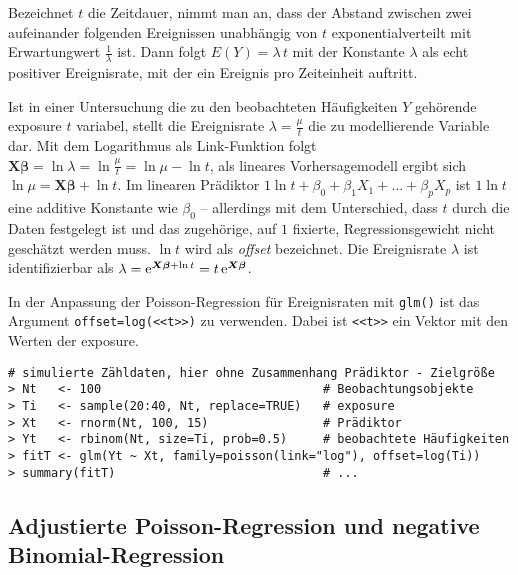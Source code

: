 Bezeichnet $t$ die Zeitdauer, nimmt man an, dass der Abstand zwischen zwei aufeinander folgenden Ereignissen unabhängig von $t$ exponentialverteilt mit Erwartungwert $\frac{1}{\lambda}$ ist. Dann folgt $E(Y) = \lambda \, t$ mit der Konstante $\lambda$ als echt positiver Ereignisrate, mit der ein Ereignis pro Zeiteinheit auftritt.

Ist in einer Untersuchung die zu den beobachteten Häufigkeiten $Y$ gehörende exposure $t$ variabel, stellt die Ereignisrate $\lambda = \frac{\mu}{t}$ die zu modellierende Variable dar. Mit dem Logarithmus als Link-Funktion folgt $\bm{X} \bm{\beta} = \ln \lambda = \ln \frac{\mu}{t} = \ln \mu - \ln t$, als lineares Vorhersagemodell ergibt sich $\ln \mu = \bm{X} \bm{\beta} + \ln t$. Im linearen Prädiktor $1 \ln t + \beta_{0} + \beta_{1} X_{1} + \dots + \beta_{p} X_{p}$ ist $1 \ln t$ eine additive Konstante wie $\beta_{0}$ -- allerdings mit dem Unterschied, dass $t$ durch die Daten festgelegt ist und das zugehörige, auf $1$ fixierte, Regressionsgewicht nicht geschätzt werden muss. $\ln t$ wird als \emph{offset} bezeichnet. Die Ereignisrate $\lambda$ ist identifizierbar als $\lambda = {\mathrm{e}}^{\bm{X} \bm{\beta} + \ln t} = t \, {\mathrm{e}}^{\bm{X} \bm{\beta}}$.

In der Anpassung der Poisson-Regression für Ereignisraten mit \lstinline!glm()! ist das Argument \lstinline!offset=log(<<t>>)! zu verwenden. Dabei ist \lstinline!<<t>>! ein Vektor mit den Werten der exposure.
\begin{lstlisting}
# simulierte Zähldaten, hier ohne Zusammenhang Prädiktor - Zielgröße
> Nt   <- 100                               # Beobachtungsobjekte
> Ti   <- sample(20:40, Nt, replace=TRUE)   # exposure
> Xt   <- rnorm(Nt, 100, 15)                # Prädiktor
> Yt   <- rbinom(Nt, size=Ti, prob=0.5)     # beobachtete Häufigkeiten
> fitT <- glm(Yt ~ Xt, family=poisson(link="log"), offset=log(Ti))
> summary(fitT)                             # ...
\end{lstlisting}

\subsection{Adjustierte Poisson-Regression und negative Binomial-Regression}

